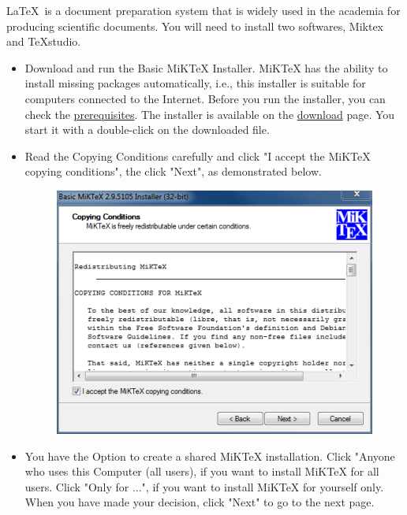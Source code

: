 \documentclass[10pt]{article} %
\begin{document}
      \LaTeX~is a document preparation system that is widely used in the academia for producing scientific documents.
      You will need to install two softwares,  Miktex and TeXstudio. \\
      \begin{itemize}
        \item Download and run the Basic MiKTeX Installer.
        MiKTeX has the ability to install missing packages automatically, i.e., this installer is suitable for computers connected to the Internet.
        Before you run the installer, you can check the \href{https://miktex.org/kb/prerequisites-2-9}{prerequisites}.
        The installer is available on the \href{https://miktex.org/download}{download} page.
        You start it with a double-click on the downloaded file.
        \item Read the Copying Conditions carefully and click "I accept the MiKTeX copying conditions", the click "Next", as demonstrated below.

        \begin{figure}[!ht]
          \centering
          \includegraphics[width=0.7\linewidth]{figs/basic-miktex-license-2-9}
          \caption{}
          \label{fig:basic-miktex-license-2-9}
        \end{figure}
        \item You have the Option to create a shared MiKTeX installation.
        Click "Anyone who uses this Computer (all users), if you want to install MiKTeX for all users.
        Click "Only for ...", if you want to install MiKTeX for yourself only.
        When you have made your decision, click "Next" to go to the next page.


\end{itemize}
\end{document}
